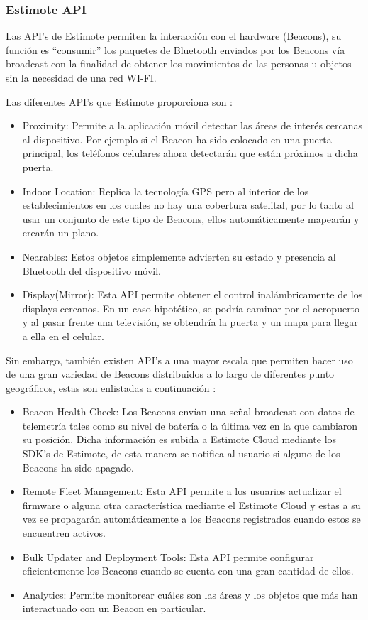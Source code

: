 \subsubsection{Estimote API}
Las API's de Estimote permiten la interacción con el hardware (Beacons), su función es ``consumir'' los paquetes de Bluetooth enviados por los Beacons vía broadcast con la finalidad de obtener los movimientos de las personas u objetos sin la necesidad de una red WI-FI. 
\\ \par
Las diferentes API's que Estimote proporciona son \cite{EstimoteAPI}:
\begin{itemize}
\item Proximity: Permite a la aplicación móvil detectar las áreas de interés cercanas al dispositivo. Por ejemplo si el Beacon ha sido colocado en una puerta principal, los teléfonos celulares ahora detectarán que están próximos a dicha puerta.
\item Indoor Location: Replica la tecnología GPS pero al interior de los establecimientos en los cuales no hay una cobertura satelital, por lo tanto al usar un conjunto de este tipo de Beacons, ellos automáticamente mapearán y crearán un plano.
\item Nearables: Estos objetos simplemente advierten su estado y presencia al Bluetooth del dispositivo móvil.
\item Display(Mirror): Esta API permite obtener el control inalámbricamente de los displays cercanos. En un caso hipotético, se podría caminar por el aeropuerto y al pasar frente una televisión, se obtendría la puerta y un mapa para llegar a ella en el celular.
\end{itemize}

Sin embargo, también existen API's a una mayor escala que permiten hacer uso de una gran variedad de Beacons distribuidos a lo largo de diferentes punto geográficos, estas son enlistadas a continuación \cite{EstimoteAPI}:
\begin{itemize}
\item Beacon Health Check: Los Beacons envían una señal broadcast con datos de telemetría tales como su nivel de batería o la última vez en la que cambiaron su posición. Dicha información es subida a Estimote Cloud mediante los SDK's de Estimote, de esta manera se notifica al usuario si alguno de los Beacons ha sido apagado.
\item Remote Fleet Management: Esta API permite a los usuarios actualizar el firmware o alguna otra característica mediante el Estimote Cloud y estas a su vez se propagarán automáticamente a los Beacons registrados cuando estos se encuentren activos.
\item Bulk Updater and Deployment Tools: Esta API permite configurar eficientemente los Beacons cuando se cuenta con una gran cantidad de ellos.
\item Analytics: Permite monitorear cuáles son las áreas y los objetos que más han interactuado con un Beacon en particular. 
\end{itemize}


